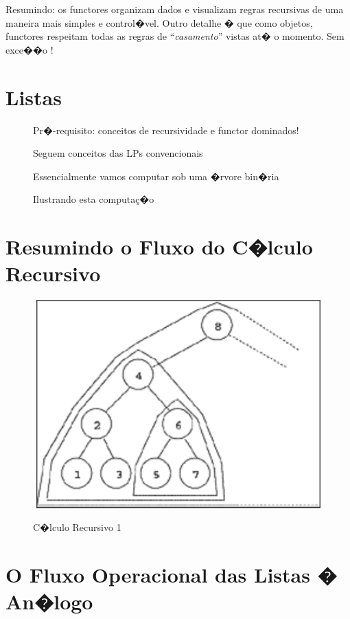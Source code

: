 \documentclass[final,a4paper]{article}
\begin{document}
\noindent Resumindo: os functores  organizam dados e visualizam
regras recursivas de uma maneira mais simples e
control�vel. Outro detalhe � que como objetos,
functores respeitam todas as regras de ``{\em casamento}''
vistas at� o momento. Sem exce��o !



\section{Listas}

\begin{description}
\item [] Pr�-requisito: conceitos de recursividade e functor dominados!
\item [] Seguem conceitos das LPs convencionais
\item [] Essencialmente vamos computar sob uma �rvore
bin�ria
\item [] Ilustrando esta computa\c{c}�o 
\end{description}


\section{Resumindo o Fluxo do C�lculo Recursivo}


\begin{figure}[!htb]
\centering
\includegraphics[height=8cm, width=12cm]{figuras/arvore_recursiva_1.pdf}
\label{fig_arv_recurs_1}
\caption{C�lculo Recursivo 1}
\end{figure}


\section{O Fluxo Operacional das Listas � An�logo}
\end{document}
